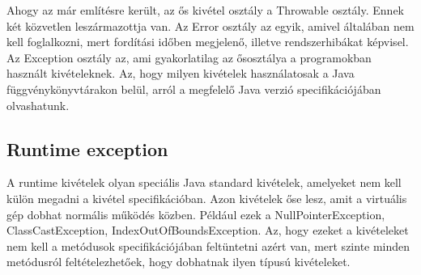 \documentclass[margin=0px]{article}
\begin{document}
Ahogy az már említésre került, az ős kivétel osztály a Throwable osztály. Ennek két közvetlen leszármazottja van. Az Error osztály az egyik, amivel általában nem kell foglalkozni, mert fordítási időben megjelenő, illetve rendszerhibákat képvisel. Az Exception osztály az, ami gyakorlatilag az ősosztálya a programokban használt kivételeknek. Az, hogy milyen kivételek használatosak a Java függvénykönyvtárakon belül, arról a megfelelő Java verzió specifikációjában olvashatunk.

\subsection{Runtime exception}

A runtime kivételek olyan speciális Java standard kivételek, amelyeket nem kell külön megadni a kivétel specifikációban. Azon kivételek őse lesz, amit a virtuális gép dobhat normális működés közben. Például ezek a NullPointerException, ClassCastException, IndexOutOfBoundsException. Az, hogy ezeket a kivételeket nem kell a metódusok specifikációjában feltüntetni azért van, mert szinte minden metódusról feltételezhetőek, hogy dobhatnak ilyen típusú kivételeket.
\end{document}
